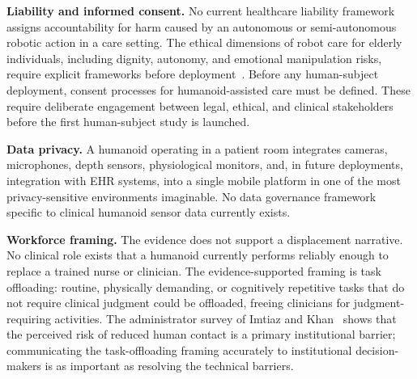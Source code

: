 \textbf{Liability and informed consent.} No current healthcare liability
framework assigns accountability for harm caused by an autonomous or
semi-autonomous robotic action in a care setting. The ethical dimensions of robot
care for elderly individuals, including dignity, autonomy, and emotional
manipulation risks, require explicit frameworks before
deployment~\cite{sharkey2012granny}. Before any human-subject deployment, consent
processes for humanoid-assisted care must be defined. These require deliberate
engagement between legal, ethical, and clinical stakeholders before the first
human-subject study is launched.

\textbf{Data privacy.} A humanoid operating in a patient room integrates cameras,
microphones, depth sensors, physiological monitors, and, in future deployments,
integration with EHR systems, into a single mobile platform in one of the most
privacy-sensitive environments imaginable. No data governance framework specific
to clinical humanoid sensor data currently exists.

\textbf{Workforce framing.} The evidence does not support a displacement
narrative. No clinical role exists that a humanoid currently performs reliably
enough to replace a trained nurse or clinician. The evidence-supported framing is
task offloading: routine, physically demanding, or cognitively repetitive tasks
that do not require clinical judgment could be offloaded, freeing clinicians for
judgment-requiring activities. The administrator survey of Imtiaz and
Khan~\cite{imtiaz2024perceptions} shows that the perceived risk of reduced human
contact is a primary institutional barrier; communicating the task-offloading
framing accurately to institutional decision-makers is as important as resolving
the technical barriers.

